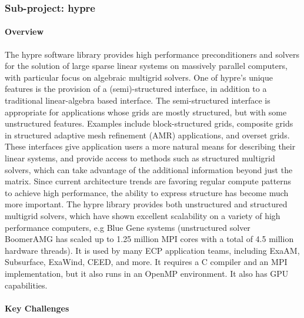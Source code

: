 \subsubsection{ Sub-project: hypre}

\paragraph{Overview}
The hypre software library \cite{hypre:homepage,hypre_design_impl_2006} provides high performance preconditioners and solvers for the solution of large sparse linear systems on massively parallel computers, with particular focus on algebraic multigrid solvers. One of hypre’s unique features is the provision of a (semi)-structured interface, in addition to a traditional linear-algebra based interface. The semi-structured interface is appropriate for applications whose grids are mostly structured, but with some unstructured features. Examples include block-structured grids, composite grids in structured adaptive mesh refinement (AMR) applications, and overset grids. These interfaces give application users a more natural means for describing their linear systems, and provide access to methods such as structured multigrid solvers, which can take advantage of the additional information beyond just the matrix. Since current architecture trends are favoring regular compute patterns to achieve high performance, the ability to express structure has become much more important. The hypre library provides both unstructured and structured multigrid solvers, which have shown excellent scalability on a variety of high performance computers, e.g Blue Gene systems (unstructured solver BoomerAMG has scaled up to 1.25 million MPI cores with a total of 4.5 million hardware threads). It is used by many ECP application teams, including ExaAM, Subsurface, ExaWind, CEED, and more. It requires a C compiler and an MPI implementation, but it also runs in an OpenMP environment. It also has GPU capabilities.

\paragraph{Key  Challenges}

